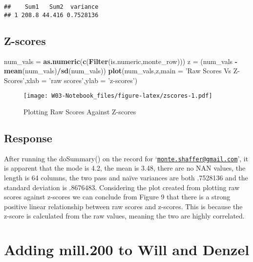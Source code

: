 \documentclass[
]{article}
\newenvironment{Shaded}{\begin{snugshade}}{\end{snugshade}}
\newcommand{\DataTypeTok}[1]{\textcolor[rgb]{0.13,0.29,0.53}{#1}}
\newcommand{\KeywordTok}[1]{\textcolor[rgb]{0.13,0.29,0.53}{\textbf{#1}}}
\newcommand{\NormalTok}[1]{#1}
\newcommand{\OperatorTok}[1]{\textcolor[rgb]{0.81,0.36,0.00}{\textbf{#1}}}
\newcommand{\StringTok}[1]{\textcolor[rgb]{0.31,0.60,0.02}{#1}}
\begin{document}
\begin{Shaded}
\begin{Highlighting}[]
\begin{verbatim}
##    Sum1   Sum2  variance
## 1 208.8 44.416 0.7528136
\end{verbatim}

\hypertarget{z-scores}{%
\subsection{Z-scores}\label{z-scores}}

\begin{Shaded}
\begin{Highlighting}[]
\NormalTok{num_vals =}\StringTok{ }\KeywordTok{as.numeric}\NormalTok{(}\KeywordTok{c}\NormalTok{(}\KeywordTok{Filter}\NormalTok{(is.numeric,monte_row)))}
\NormalTok{z =}\StringTok{ }\NormalTok{(num_vals }\OperatorTok{-}\StringTok{ }\KeywordTok{mean}\NormalTok{(num_vals)}\OperatorTok{/}\KeywordTok{sd}\NormalTok{(num_vals))}
\KeywordTok{plot}\NormalTok{(num_vals,z,}\DataTypeTok{main =} \StringTok{'Raw Scores Vs Z-Scores'}\NormalTok{,}\DataTypeTok{xlab =} \StringTok{'raw scores'}\NormalTok{,}\DataTypeTok{ylab =} \StringTok{'z-scores'}\NormalTok{)}
\end{Highlighting}
\end{Shaded}

\begin{figure}
\centering
\texttt{[image: W03-Notebook\_files/figure-latex/zscores-1.pdf]}
\caption{Plotting Raw Scores Against Z-scores}
\end{figure}

\hypertarget{response-1}{%
\subsection{Response}\label{response-1}}

After running the doSummary() on the record for
`\href{mailto:monte.shaffer@gmail.com}{\nolinkurl{monte.shaffer@gmail.com}}',
it is apparent that the mode is 4.2, the mean is 3.48, there are no NAN
values, the length is 64 columns, the two pass and naïve variances are
both .7528136 and the standard deviation is .8676483. Considering the
plot created from plotting raw scores against z-scores we can conclude
from Figure 9 that there is a strong positive linear relationship
between raw scores and z-scores. This is because the z-score is
calculated from the raw values, meaning the two are highly correlated.

\hypertarget{adding-mill.200-to-will-and-denzel}{%
\section{Adding mill.200 to Will and
Denzel}\label{adding-mill.200-to-will-and-denzel}}


\end{Highlighting}
\end{Shaded}
\end{document}

